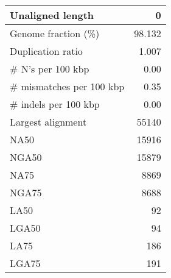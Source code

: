 \documentclass[12pt,a4paper]{article}
\begin{document}
\begin{table}[ht]
\begin{center}
\begin{tabular}{|l*{1}{|r}|}
Unaligned length & 0 \\ \hline
Genome fraction (\%) & 98.132 \\ \hline
Duplication ratio & 1.007 \\ \hline
\# N's per 100 kbp & 0.00 \\ \hline
\# mismatches per 100 kbp & 0.35 \\ \hline
\# indels per 100 kbp & 0.00 \\ \hline
Largest alignment & 55140 \\ \hline
NA50 & 15916 \\ \hline
NGA50 & 15879 \\ \hline
NA75 & 8869 \\ \hline
NGA75 & 8688 \\ \hline
LA50 & 92 \\ \hline
LGA50 & 94 \\ \hline
LA75 & 186 \\ \hline
LGA75 & 191 \\ \hline
\end{tabular}
\end{center}
\end{table}
\end{document}
